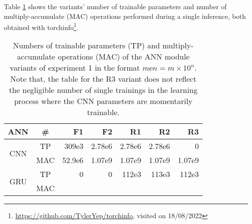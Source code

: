 Table \ref{tab:exp1_num_params} shows the variants'
number of trainable parameters and 
number of multiply-accumulate (MAC) operations 
performed during a single inference,
both obtained with 
torchinfo\footnote{\url{https://github.com/TylerYep/torchinfo}, visited on 18/08/2022}.
\providecommand{\ncols}{}\renewcommand{\ncols}{7}
\begin{table}[h]
    \caption[
        Numbers of trainable parameters 
        and multiply-accumulate operations
        of the ANN module variants of experiment 1
    ]{
        Numbers of trainable parameters (TP)
        and multiply-accumulate operations (MAC)
        of the ANN module variants of experiment 1
        in the format $m\text{e}n = m\times 10^n$.
        Note that, 
        the table for the R3 variant does not reflect 
        the negligible number of single trainings 
        in the learning process
        where the CNN parameters are momentarily trainable.
        \label{tab:exp1_num_params}}        
    \centering
    \begin{tabular}{|c|c|r|r|r|r|r|} 
        \hline
        ANN
        &\#
        &F1
        &F2
        &R1
        &R2
        &R3
        \\\hline\hline
        \multirow{2}{*}{CNN}
        &TP
        &309e3
        &2.78e6
        &2.78e6
        &2.78e6
        &0
        \\\cline{2-\ncols}
        &MAC
        &52.9e6
        &1.07e9
        &1.07e9
        &1.07e9
        &1.07e9
        \\\hline
        \multirow{2}{*}{GRU}
        &TP
        &0
        &0
        &112e3
        &113e3
        &112e3
        \\\cline{2-\ncols}
        &MAC

\end{tabular}
\end{table}
